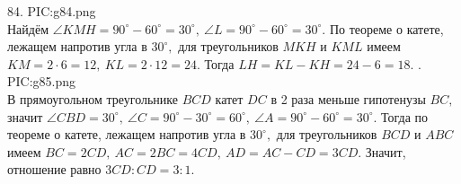 84. {{PIC:g84.png}}\\
Найдём $\angle KMH=90^\circ-60^\circ=30^\circ,\ \angle L=90^\circ-60^\circ=30^\circ.$ По теореме о катете, лежащем напротив угла в $30^\circ,$ для треугольников $MKH$ и $KML$ имеем $KM=2\cdot6=12,\ KL=2\cdot12=24.$ Тогда $LH=KL-KH=24-6=18.$\newpage
{}. {{PIC:g85.png}}\\
В прямоугольном треугольнике $BCD$ катет $DC$ в 2 раза меньше гипотенузы $BC,$ значит $\angle CBD=30^\circ,\ \angle C=90^\circ-30^\circ=60^\circ,\ \angle A=90^\circ-60^\circ=30^\circ.$ Тогда по теореме о катете, лежащем напротив угла в $30^\circ,$ для треугольников $BCD$ и $ABC$ имеем $BC=2CD,\ AC=2BC=4CD,\ AD=AC-CD=3CD.$ Значит, отношение равно $3CD:CD=3:1.$\\
